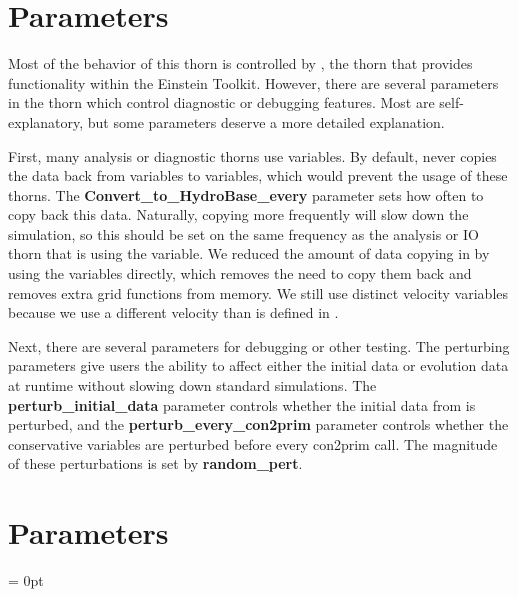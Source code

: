 \documentclass{article}
\newlength{\tableWidth} \newlength{\maxVarWidth} \newlength{\paraWidth} \newlength{\descWidth}
\begin{document}
\section{Parameters}

Most of the behavior of this thorn is controlled by \glib,
the thorn that provides \grhayl{} functionality
within the Einstein Toolkit. However, there are several
parameters in the thorn which control diagnostic or debugging
features. Most are self-explanatory, but some parameters deserve
a more detailed explanation.

First, many analysis or diagnostic thorns use \hydrobase{} variables.
By default, \ghd{} never copies the data back from \ghd{} variables
to \hydrobase{} variables, which would prevent the usage of these
thorns. The \textbf{Convert\_to\_HydroBase\_every} parameter
sets how often to copy back this data. Naturally, copying more
frequently will slow down the simulation, so this should be set
on the same frequency as the analysis or IO thorn that is using
the \hydrobase{} variable. We reduced the amount of data copying in \ghd{}
by using the \hydrobase{} variables directly, which removes the need
to copy them back and removes extra grid functions from memory.
We still use distinct velocity variables because we use a different
velocity than is defined in \hydrobase.

Next, there are several parameters for debugging or other testing.
The perturbing parameters give users the ability to affect either
the initial data or evolution data at runtime without slowing down
standard simulations. The \textbf{perturb\_initial\_data} parameter
controls whether the initial data from \hydrobase{} is perturbed, and
the \textbf{perturb\_every\_con2prim} parameter controls whether
the conservative variables are perturbed before every con2prim call.
The magnitude of these perturbations is set by \textbf{random\_pert}.




\section{Parameters} 


\parskip = 0pt

\setlength{\tableWidth}{160mm}

\setlength{\paraWidth}{\tableWidth}
\setlength{\descWidth}{\tableWidth}
\settowidth{\maxVarWidth}{convert\_to\_hydrobase\_every}
\end{document}
